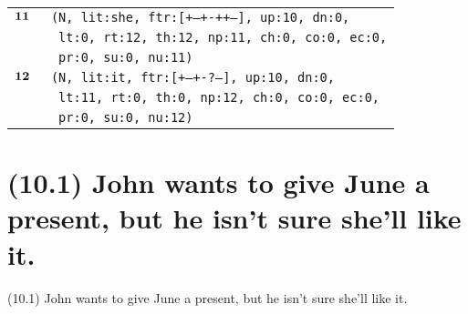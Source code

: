 \documentclass{article}
\begin{document}
\begin{minipage}{\textwidth}
{\begin{tabular}{|r|l|}
    ${\textbf{\textrm{11}}_{\phantom{z}}}$ & \texttt{\texttt{(N,~lit:she,~ftr:[+--+-++--],~up:10,~dn:0,}} \\
    & \texttt{\texttt{~lt:0,~rt:12,~th:12,~np:11,~ch:0,~co:0,~ec:0,}} \\
    & \texttt{\texttt{~pr:0,~su:0,~nu:11)}} \\
    ${\textbf{\textrm{12}}_{\phantom{z}}}$ & \texttt{\texttt{(N,~lit:it,~ftr:[+--+-?---],~up:10,~dn:0,}} \\
    & \texttt{\texttt{~lt:11,~rt:0,~th:0,~np:12,~ch:0,~co:0,~ec:0,}} \\
    & \texttt{\texttt{~pr:0,~su:0,~nu:12)}} \\
    \hline
  \end{tabular}
  }
\end{minipage}
\bigbreak

\clearpage

%
%

\section*{(10.1) John wants to give June a present, but he isn't sure she’ll like it.}

\bigbreak
\begin{enumerate*}
\item[(10.1)] John wants to give June a present, but he isn't sure she’ll like it.
\end{enumerate*}
\bigbreak
\end{document}
